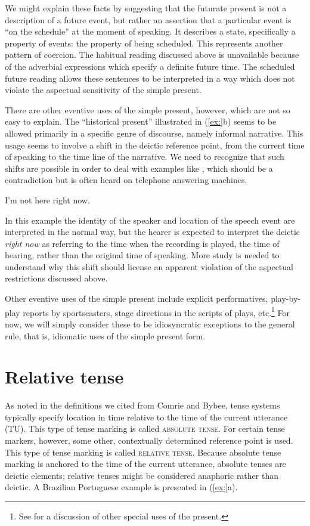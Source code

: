 We might explain these facts by suggesting that the futurate present is not a description of a future event, but rather an assertion that a particular event is “on the schedule” at the moment of speaking. It describes a state, specifically a property of events: the property of being scheduled. This represents another pattern of coercion. The habitual reading discussed above is unavailable because of the adverbial expressions which specify a definite future time. The scheduled future reading allows these sentences to be interpreted in a way which does not violate the aspectual sensitivity of the simple present.


There are other eventive uses of the simple present, however, which are not so easy to explain. The “historical present” illustrated in (\ref{ex:}b) seems to be allowed primarily in a specific genre of discourse, namely informal narrative. This usage seems to involve a shift in the deictic reference point, from the current time of speaking to the time line of the narrative. We need to recognize that such shifts are possible in order to deal with examples like , which should be a contradiction but is often heard on telephone answering machines.


\ea
I’m not here right now.
\z


In this example the identity of the speaker and location of the speech event are interpreted in the normal way, but the hearer is expected to interpret the deictic \textit{right now} as referring to the time when the recording is played, the time of hearing, rather than the original time of speaking. More study is needed to understand why this shift should license an apparent violation of the aspectual restrictions discussed above.



Other eventive uses of the simple present include explicit performatives, play-by-play reports by sportscasters, stage directions in the scripts of plays, etc.\footnote{See \citet{Klein2009} for a discussion of other special uses of the present.} For now, we will simply consider these to be idiosyncratic exceptions to the general rule, that is, idiomatic uses of the simple present form.


\section{Relative tense}\label{sec:} %

As noted in the definitions we cited from Comrie and Bybee, tense systems typically specify location in time relative to the time of the current utterance (TU). This type of tense marking is called \textsc{absolute tense}. For certain tense markers, however, some other, contextually determined reference point is used. This type of tense marking is called \textsc{relative tense}. Because absolute tense marking is anchored to the time of the current utterance, absolute tenses are deictic elements; relative tenses might be considered anaphoric rather than deictic. A Brazilian Portuguese example is presented in (\ref{ex:}a).


